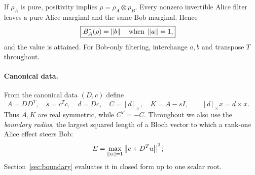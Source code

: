 If $\rho_A$ is pure, positivity implies $\rho=\rho_A\otimes\rho_B$. Every nonzero invertible Alice filter leaves a pure Alice marginal and the same Bob marginal. Hence
\begin{equation}
 \boxed{B_A^*(\rho)=\left\lVert b\right\rVert\quad\text{when }\left\lVert a\right\rVert=1,}
 \label{eq:puremarginal}
\end{equation}
and the value is attained. For Bob-only filtering, interchange $a,b$ and transpose $T$ throughout.

\paragraph{Canonical data.}
From the canonical data $(D,c)$ define
\begin{equation}
 A=DD^T,\quad s=c^Tc,\quad d=Dc,\quad C=[d]_\times,\quad K=A-sI,
 \qquad [d]_\times x=d\times x.
 \label{eq:data}
\end{equation}
Thus $A,K$ are real symmetric, while $C^T=-C$. Throughout we also use the \emph{boundary radius}, the largest squared length of a Bloch vector to which a rank-one Alice effect steers Bob:
\begin{equation}
 E=\max_{\left\lVert u\right\rVert=1}\left\lVert c+D^Tu\right\rVert^2;
 \label{eq:boundarydescription}
\end{equation}
Section~\ref{sec:boundary} evaluates it in closed form up to one scalar root.

